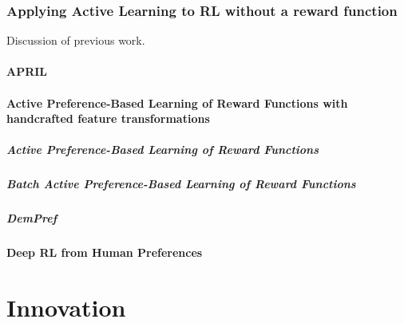 \documentclass[11pt, a4paper, bibliography=totoc]{report}
\begin{document}
\section{Applying Active Learning to RL without a reward function}
Discussion of previous work.

\subsection{APRIL}

\subsection{Active Preference-Based Learning of Reward Functions with handcrafted feature transformations}%

\subsubsection{Active Preference-Based Learning of Reward Functions}

\subsubsection{Batch Active Preference-Based Learning of Reward Functions}

\subsubsection{DemPref}

\subsection{Deep RL from Human Preferences}


\part{Innovation}
\end{document}
